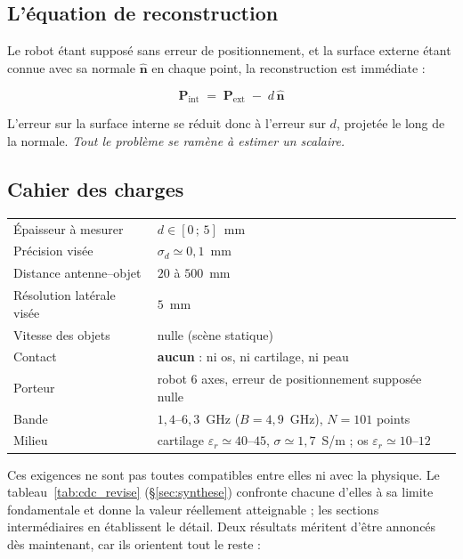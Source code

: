 \documentclass[11pt,a4paper]{article}
\newcommand{\eps}{\varepsilon_r}
\newcommand{\nvec}{\hat{\mathbf{n}}}
\begin{document}
\subsection{L'équation de reconstruction}

Le robot étant supposé sans erreur de positionnement, et la surface externe
étant connue avec sa normale $\nvec$ en chaque point, la reconstruction est
immédiate :

\begin{equation}
\boxed{\;\mathbf{P}_{\text{int}} \;=\; \mathbf{P}_{\text{ext}}
        \;-\; d\,\nvec\;}
\label{eq:reconstruction}
\end{equation}

L'erreur sur la surface interne se réduit donc à l'erreur sur $d$, projetée le
long de la normale. \emph{Tout le problème se ramène à estimer un scalaire.}

\subsection{Cahier des charges}
\label{sec:cdc}

\begin{table}[h]
\centering
\begin{tabular}{ll}
\toprule
Épaisseur à mesurer & $d \in [0\,;\,5]$~mm \\
Précision visée & $\sigma_d \simeq 0{,}1$~mm \\
Distance antenne--objet & $20$ à $500$~mm \\
Résolution latérale visée & $5$~mm \\
Vitesse des objets & nulle (scène statique) \\
Contact & \textbf{aucun} : ni os, ni cartilage, ni peau \\
Porteur & robot 6 axes, erreur de positionnement supposée nulle \\
Bande & $1{,}4$--$6{,}3$~GHz ($B = 4{,}9$~GHz), $N = 101$ points \\
Milieu & cartilage $\eps \simeq 40$--$45$, $\sigma \simeq 1{,}7$~S/m ;
         os $\eps \simeq 10$--$12$ \\
\bottomrule
\end{tabular}
\end{table}

\noindent
Ces exigences ne sont pas toutes compatibles entre elles ni avec la physique.
Le tableau~\ref{tab:cdc_revise} (\S\ref{sec:synthese}) confronte chacune d'elles
à sa limite fondamentale et donne la valeur réellement atteignable ; les
sections intermédiaires en établissent le détail. Deux résultats méritent d'être
annoncés dès maintenant, car ils orientent tout le reste :
\end{document}
